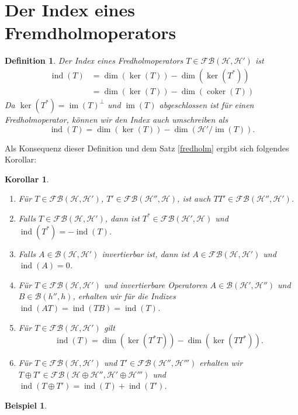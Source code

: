 \documentclass[11pt, hidelinks]{article}
\newcommand{\h}{\mathcal{H}}
\newcommand{\ind}{\operatorname{ind}}
\newcommand{\im}{\operatorname{im}}
\newcommand{\coker}{\operatorname{coker}}
\numberwithin{conj}{section}
\newtheorem{definition}[conj]{Definition}
\newtheorem{example}[conj]{Beispiel}
\newtheorem{corollary}[conj]{Korollar}
\begin{document}
\section{Der Index eines Fremdholmoperators}
\begin{definition}
    Der Index eines Fredholmoperators $T \in \mathcal{FB}(\h,\h')$ ist
    \begin{align}
        \ind(T) &= \dim(\ker(T)) - \dim(\ker(T^\ast)) \nonumber\\
                &= \dim(\ker(T)) - \dim(\coker(T))
    \end{align}
    Da $\ker(T^\ast) = \im(T)^\perp$ und $\im(T)$ abgeschlossen ist für einen Fredholmoperator, können wir den Index auch umschreiben als
    \begin{equation}
        \ind(T) = \dim(\ker(T)) - \dim(\h'/\im(T)).
    \end{equation}
\end{definition}

Als Konsequenz dieser Definition und dem Satz \ref{fredholm} ergibt sich folgendes Korollar:

\begin{corollary}\noindent
    \begin{enumerate}
        \item Für $T \in \mathcal{FB}(\h,\h')$, $T' \in \mathcal{FB}(\h'',\h)$, ist auch $TT'\in \mathcal{FB}(\h'',\h')$.
        \item Falls $T \in \mathcal{FB}(\h,\h')$, dann ist $T^\ast \in \mathcal{FB}(\h',\h)$ und $\ind(T^\ast) = - \ind(T)$.
        \item Falls $A \in \mathcal{B}(\h,\h')$ invertierbar ist, dann ist $A \in \mathcal{FB}(\h,\h')$ und $\ind(A) = 0$.
        \item Für $T \in \mathcal{FB}(\h,\h')$ und invertierbare Operatoren $A \in \mathcal{B}(\h',\h'')$ und $B \in \mathcal{B}(h'',h)$, erhalten wir für die Indizes $\ind(AT) = \ind(TB) = \ind(T)$.
        \item Für $T \in \mathcal{FB}(\h,\h')$ gilt
        \begin{equation}
            \ind(T) = \dim(\ker(T^\ast T)) - \dim(\ker(TT^\ast)).
        \end{equation}
        \item Für $T \in \mathcal{FB}(\h,\h')$ und $T' \in \mathcal{FB}(\h'',\h''')$ erhalten wir $T \oplus T' \in \mathcal{FB}(\h \oplus \h'', \h' \oplus \h''')$ und $\ind(T \oplus T') = \ind(T) + \ind(T')$. 
    \end{enumerate}
\end{corollary}

\begin{example}
    
\end{example}

\singlespacing
\nocite{*}


\end{document}
